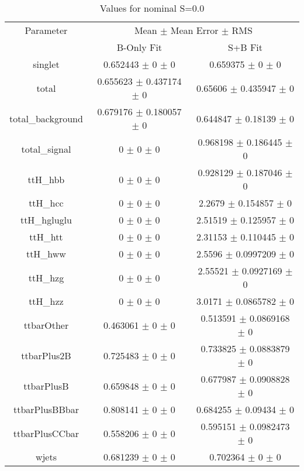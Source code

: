 \begin{table}
\centering
\caption{Values for nominal S=0.0}
\begin{tabular}{ccc}
\toprule
Parameter & \multicolumn{2}{c}{Mean $\pm$ Mean Error $\pm$ RMS}\\
 & B-Only Fit & S+B Fit\\
\midrule
singlet & \num{0.652443} $\pm$ \num{0} $\pm$ \num{0} & \num{0.659375} $\pm$ \num{0} $\pm$ \num{0}\\
total & \num{0.655623} $\pm$ \num{0.437174} $\pm$ \num{0} & \num{0.65606} $\pm$ \num{0.435947} $\pm$ \num{0}\\
total\_background & \num{0.679176} $\pm$ \num{0.180057} $\pm$ \num{0} & \num{0.644847} $\pm$ \num{0.18139} $\pm$ \num{0}\\
total\_signal & \num{0} $\pm$ \num{0} $\pm$ \num{0} & \num{0.968198} $\pm$ \num{0.186445} $\pm$ \num{0}\\
ttH\_hbb & \num{0} $\pm$ \num{0} $\pm$ \num{0} & \num{0.928129} $\pm$ \num{0.187046} $\pm$ \num{0}\\
ttH\_hcc & \num{0} $\pm$ \num{0} $\pm$ \num{0} & \num{2.2679} $\pm$ \num{0.154857} $\pm$ \num{0}\\
ttH\_hgluglu & \num{0} $\pm$ \num{0} $\pm$ \num{0} & \num{2.51519} $\pm$ \num{0.125957} $\pm$ \num{0}\\
ttH\_htt & \num{0} $\pm$ \num{0} $\pm$ \num{0} & \num{2.31153} $\pm$ \num{0.110445} $\pm$ \num{0}\\
ttH\_hww & \num{0} $\pm$ \num{0} $\pm$ \num{0} & \num{2.5596} $\pm$ \num{0.0997209} $\pm$ \num{0}\\
ttH\_hzg & \num{0} $\pm$ \num{0} $\pm$ \num{0} & \num{2.55521} $\pm$ \num{0.0927169} $\pm$ \num{0}\\
ttH\_hzz & \num{0} $\pm$ \num{0} $\pm$ \num{0} & \num{3.0171} $\pm$ \num{0.0865782} $\pm$ \num{0}\\
ttbarOther & \num{0.463061} $\pm$ \num{0} $\pm$ \num{0} & \num{0.513591} $\pm$ \num{0.0869168} $\pm$ \num{0}\\
ttbarPlus2B & \num{0.725483} $\pm$ \num{0} $\pm$ \num{0} & \num{0.733825} $\pm$ \num{0.0883879} $\pm$ \num{0}\\
ttbarPlusB & \num{0.659848} $\pm$ \num{0} $\pm$ \num{0} & \num{0.677987} $\pm$ \num{0.0908828} $\pm$ \num{0}\\
ttbarPlusBBbar & \num{0.808141} $\pm$ \num{0} $\pm$ \num{0} & \num{0.684255} $\pm$ \num{0.09434} $\pm$ \num{0}\\
ttbarPlusCCbar & \num{0.558206} $\pm$ \num{0} $\pm$ \num{0} & \num{0.595151} $\pm$ \num{0.0982473} $\pm$ \num{0}\\
wjets & \num{0.681239} $\pm$ \num{0} $\pm$ \num{0} & \num{0.702364} $\pm$ \num{0} $\pm$ \num{0}\\
\bottomrule
\end{tabular}
\end{table}
